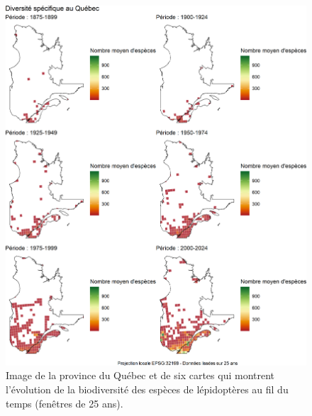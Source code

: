 \documentclass[9pt,twocolumn,twoside,]{pnas-new}
\begin{document}
\begin{figure}

\includegraphics[width=1\linewidth]{../Figures_analyse/cartes_combinees} \hfill{}

\caption{Image de la province du Québec et de six cartes qui montrent l'évolution de la biodiversité des espèces de lépidoptères au fil du temps (fenêtres de 25 ans).}\label{fig:fig_cartes_combinees, fullpage-figure}
\end{figure}
\end{document}
